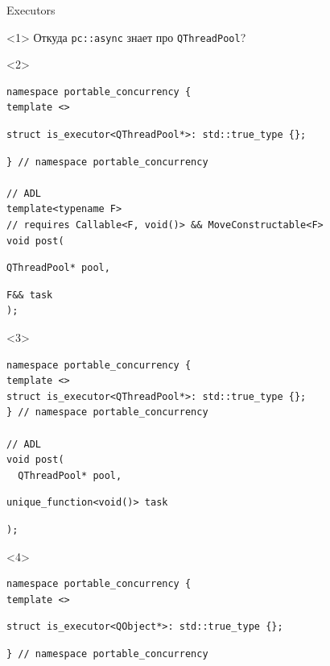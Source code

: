 \documentclass[aspectratio=169,hyperref={unicode},17pt]{beamer}
\begin{document}
\begin{frame}[fragile,t]{Executors}
\begin{onlyenv}<1>
Откуда \texttt{pc::async} знает про \texttt{QThreadPool}?
\end{onlyenv}
\begin{onlyenv}<2>
\begin{lstlisting}[style=cppcode,aboveskip=0pt,belowskip=0pt]
namespace portable_concurrency {
template <>
\end{lstlisting}
\begin{lstlisting}[style=cppcode,backgroundcolor=\color{gray!30},aboveskip=0pt,belowskip=0pt]
struct is_executor<QThreadPool*>: std::true_type {};
\end{lstlisting}
\begin{lstlisting}[style=cppcode,aboveskip=0pt,belowskip=0pt]
} // namespace portable_concurrency

// ADL
template<typename F>
// requires Callable<F, void()> && MoveConstructable<F>
void post(
\end{lstlisting}
\begin{lstlisting}[style=cppcode,backgroundcolor=\color{gray!30},aboveskip=0pt,belowskip=0pt]
  QThreadPool* pool,
\end{lstlisting}
\begin{lstlisting}[style=cppcode,aboveskip=0pt,belowskip=0pt]
  F&& task
);
\end{lstlisting}
\end{onlyenv}
\begin{onlyenv}<3>
\begin{lstlisting}[style=cppcode,aboveskip=0pt,belowskip=0pt]
namespace portable_concurrency {
template <>
struct is_executor<QThreadPool*>: std::true_type {};
} // namespace portable_concurrency

// ADL
void post(
  QThreadPool* pool,
\end{lstlisting}
\begin{lstlisting}[style=cppcode,backgroundcolor=\color{gray!30},aboveskip=0pt,belowskip=0pt]
  unique_function<void()> task
\end{lstlisting}
\begin{lstlisting}[style=cppcode,aboveskip=0pt,belowskip=0pt]
);
\end{lstlisting}
\end{onlyenv}
\begin{onlyenv}<4>
\begin{lstlisting}[style=cppcode,aboveskip=0pt,belowskip=0pt]
namespace portable_concurrency {
template <>
\end{lstlisting}
\begin{lstlisting}[style=cppcode,backgroundcolor=\color{gray!30},aboveskip=0pt,belowskip=0pt]
struct is_executor<QObject*>: std::true_type {};
\end{lstlisting}
\begin{lstlisting}[style=cppcode,aboveskip=0pt,belowskip=0pt]
} // namespace portable_concurrency


\end{lstlisting}
\end{onlyenv}
\end{frame}
\end{document}
